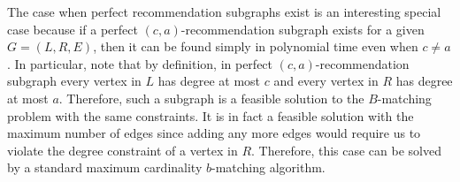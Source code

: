 The case when perfect recommendation subgraphs exist is an interesting special case because if  a perfect $(c,a)$-recommendation subgraph exists for a given $G=(L,R,E)$, then it can be found simply in polynomial time even when $c\ne a$. In particular, note that by definition, in perfect $(c,a)$-recommendation subgraph every vertex in $L$ has degree at most $c$ and every vertex in $R$ has degree at most $a$. Therefore, such a subgraph is a feasible solution to the $B$-matching problem with the same constraints. It is in fact a feasible solution with the maximum number of edges since adding any more edges would require us to violate the degree constraint of a vertex in $R$. Therefore, this case can be solved by a standard maximum cardinality $b$-matching algorithm.
